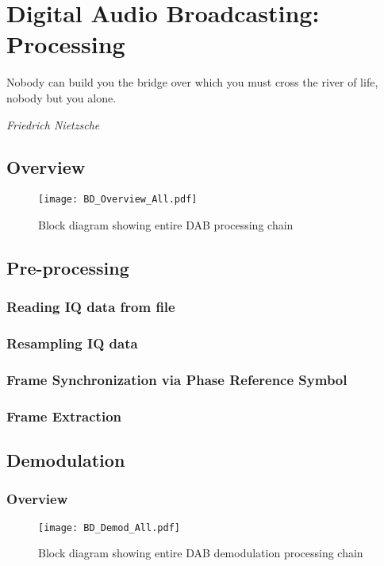 \documentclass[class=report,11pt,crop=false]{standalone}
\begin{document}
\ifstandalone
\tableofcontents
\fi
\chapter{Digital Audio Broadcasting: Processing}
\epigraph{Nobody can build you the bridge over which you must cross the river of life, nobody but you alone.}%
    {\emph{Friedrich Nietzsche}}

\section{Overview}

\begin{figure}[htbp]
    \centering
    \texttt{[image: BD\_Overview\_All.pdf]}
    \caption{Block diagram showing entire DAB processing chain}
    \label{fig:BD_Overview_All}
\end{figure}

\section{Pre-processing}
\subsection{Reading IQ data from file}
\subsection{Resampling IQ data}
\subsection{Frame Synchronization via Phase Reference Symbol}
\subsection{Frame Extraction}

\section{Demodulation}
\subsection{Overview}

\begin{figure}[htbp]
    \centering
    \texttt{[image: BD\_Demod\_All.pdf]}
    \caption{Block diagram showing entire DAB demodulation processing chain}
    \label{fig:BD_Demod_All}
\end{figure}
\end{document}
